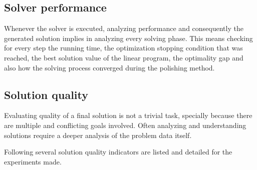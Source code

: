 \subsection{Solver performance}

Whenever the solver is executed, analyzing performance and consequently the generated solution implies in analyzing every solving phase. This means checking for every step the running time, the optimization stopping condition that was reached, the best solution value of the linear program, the optimality gap and also how the solving process converged during the polishing method.


\subsection{Solution quality}

Evaluating quality of a final solution is not a trivial task, specially because there are multiple and conflicting goals involved. Often analyzing and understanding solutions require a deeper analysis of the problem data itself.

Following several solution quality indicators are listed and detailed for the experiments made.


